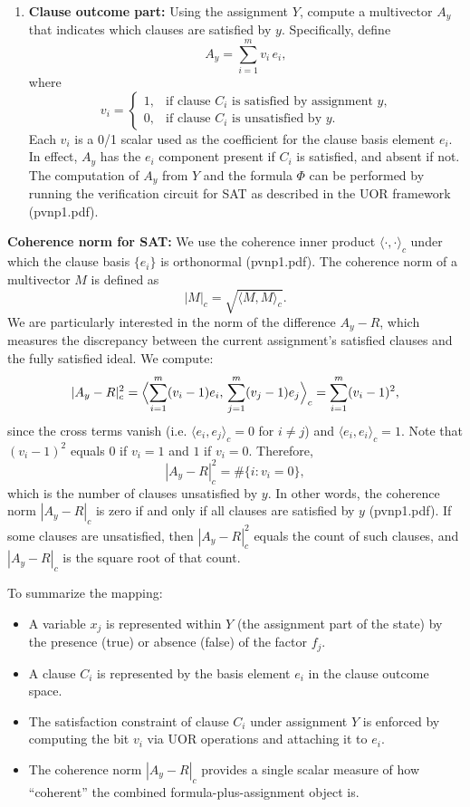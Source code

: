 \documentclass{article}
\begin{document}
\begin{itemize}
\begin{enumerate}
        \item \textbf{Clause outcome part:} Using the assignment $Y$, compute a multivector $A_y$ that indicates which clauses are satisfied by $y$. Specifically, define
        \[
        A_y = \sum_{i=1}^m v_i\, e_i,
        \]
        where 
        \[
        v_i =
        \begin{cases}
        1, & \text{if clause $C_i$ is satisfied by assignment $y$,} \\
        0, & \text{if clause $C_i$ is unsatisfied by $y$.}
        \end{cases}
        \]
        Each $v_i$ is a 0/1 scalar used as the coefficient for the clause basis element $e_i$. In effect, $A_y$ has the $e_i$ component present if $C_i$ is satisfied, and absent if not. The computation of $A_y$ from $Y$ and the formula $\Phi$ can be performed by running the verification circuit for SAT as described in the UOR framework (pvnp1.pdf).
    \end{enumerate}
\end{itemize}

\medskip
\textbf{Coherence norm for SAT:} We use the coherence inner product $\langle \cdot,\cdot \rangle_c$ under which the clause basis $\{e_i\}$ is orthonormal (pvnp1.pdf). The coherence norm of a multivector $M$ is defined as
\[
|M|_c = \sqrt{\langle M, M \rangle_c}.
\]
We are particularly interested in the norm of the difference $A_y - R$, which measures the discrepancy between the current assignment’s satisfied clauses and the fully satisfied ideal. We compute:
\[
|A_y - R|_c^2 = \Bigl\langle \sum_{i=1}^m (v_i - 1)e_i,\, \sum_{j=1}^m (v_j - 1)e_j \Bigr\rangle_c = \sum_{i=1}^m (v_i - 1)^2,
\]
since the cross terms vanish (i.e. $\langle e_i,e_j\rangle_c=0$ for $i\neq j$) and $\langle e_i,e_i\rangle_c=1$. Note that $(v_i - 1)^2$ equals $0$ if $v_i=1$ and $1$ if $v_i=0$. Therefore,
\[
|A_y - R|_c^2 = \#\{i : v_i = 0\},
\]
which is the number of clauses unsatisfied by $y$. In other words, the coherence norm $|A_y - R|_c$ is zero if and only if all clauses are satisfied by $y$ (pvnp1.pdf). If some clauses are unsatisfied, then $|A_y - R|_c^2$ equals the count of such clauses, and $|A_y - R|_c$ is the square root of that count.

\medskip
To summarize the mapping:
\begin{itemize}
    \item A variable $x_j$ is represented within $Y$ (the assignment part of the state) by the presence (true) or absence (false) of the factor $f_j$.
    \item A clause $C_i$ is represented by the basis element $e_i$ in the clause outcome space.
    \item The satisfaction constraint of clause $C_i$ under assignment $Y$ is enforced by computing the bit $v_i$ via UOR operations and attaching it to $e_i$.
    \item The coherence norm $|A_y - R|_c$ provides a single scalar measure of how “coherent” the combined formula-plus-assignment object is.
\end{itemize}
\end{document}
